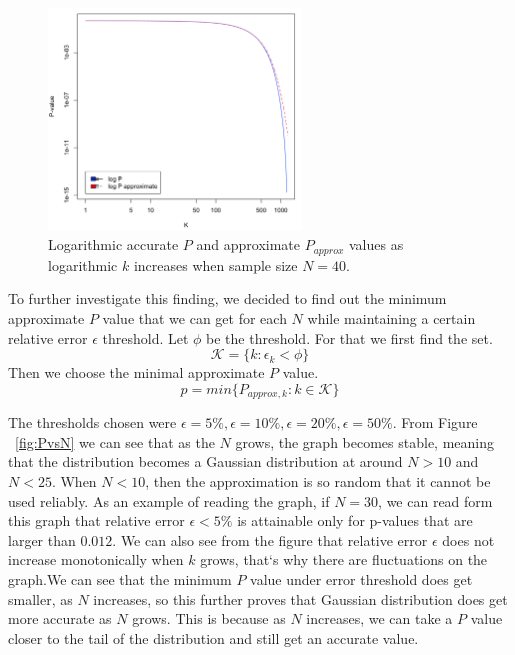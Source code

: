 \documentclass[12pt]{article}
\begin{document}
{\begin{figure}[H]
  \centering
  \includegraphics[width=0.6\textwidth]{logPlogPapproxAsKincreases}
  \caption{Logarithmic accurate $P$ and approximate $P_{approx}$ values as logarithmic $k$ increases when sample size $N=40$.}
  \label{fig:logPlogPapproxAsKincreases}
\end{figure}

To further investigate this finding, we decided to find out the minimum approximate $P$ value that we can get for each $N$ while maintaining a certain relative error $\epsilon$ threshold. Let $\phi$ be the threshold. For that we first find the set.
\begin{equation}
\mathcal{K}=\{k: \epsilon_k < \phi\}
\end{equation}
Then we choose the minimal approximate $P$ value.
\begin{equation}
p = min\{P_{approx, k}: k \in \mathcal{K}\}
\end{equation}

The thresholds chosen were $\epsilon=5\%, \epsilon=10\%, \epsilon=20\%, \epsilon=50\%$. From Figure ~\ref{fig:PvsN} we can see that as the $N$ grows, the graph becomes stable, meaning that the distribution becomes a Gaussian distribution at around $N > 10$ and $N < 25$.  When $N < 10$, then the approximation is so random that it cannot be used reliably. As an example of reading the graph, if $N=30$, we can read form this graph that relative error $\epsilon<5\%$ is attainable only for p-values that are larger than $0.012$. We can also see from the figure that relative error $\epsilon$ does not increase monotonically when $k$ grows, that`s why there are fluctuations on the graph.We can see that the minimum $P$ value under error threshold does get smaller, as $N$ increases, so this further proves that Gaussian distribution does get more accurate as $N$ grows. This is because as $N$ increases, we can take a $P$ value closer to the tail of the distribution and still get an accurate value.

}
\end{document}
